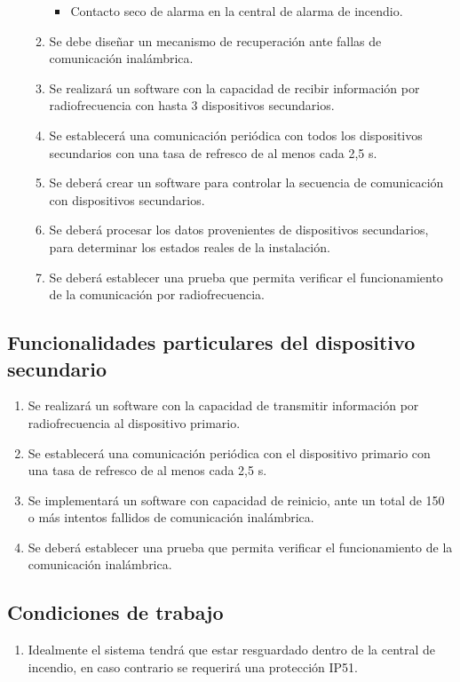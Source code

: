\begin{enumerate}
\begin{enumerate}
\begin{itemize}
				\item Contacto seco de alarma en la central de alarma de incendio.
			\end{itemize}	
		\item Se debe diseñar un mecanismo de recuperación ante fallas de comunicación inalámbrica.	
		\item Se realizará un software con la capacidad de recibir información por radiofrecuencia con hasta 3 dispositivos secundarios.
		\item Se establecerá una comunicación periódica con todos los dispositivos secundarios con una tasa de refresco de  al menos cada 2,5 s.
		\item Se deberá crear un software para controlar la secuencia de comunicación con dispositivos secundarios.
		\item Se deberá procesar los datos provenientes de dispositivos secundarios, para determinar los estados reales de la instalación.
		\item Se deberá establecer una prueba que permita verificar el funcionamiento de la comunicación por radiofrecuencia.
	\end{enumerate}
\end{enumerate}
\subsection{Funcionalidades particulares del dispositivo secundario}
	\begin{enumerate}	
		\item Se realizará un software con la capacidad de transmitir información por radiofrecuencia al dispositivo primario.
		\item Se establecerá una comunicación periódica con el dispositivo primario con una tasa de refresco de al menos cada 2,5 s.
		\item Se implementará un software con capacidad de reinicio, ante un total de 150 o más intentos fallidos de comunicación inalámbrica.
		\item Se deberá establecer una prueba que permita verificar el funcionamiento de la comunicación inalámbrica.
	\end{enumerate}
	
\subsection{Condiciones de trabajo}
	\begin{enumerate}
		\item Idealmente el sistema tendrá que estar resguardado dentro de la central de incendio, en caso contrario se requerirá una protección IP51.
	\end{enumerate}


